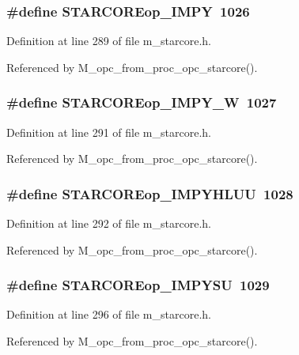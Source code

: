 \subsubsection{\setlength{\rightskip}{0pt plus 5cm}\#define STARCOREop\_\-IMPY~1026}\label{m__starcore_8h_0eb61b22086e094ae2efd020338496ee}




Definition at line 289 of file m\_\-starcore.h.

Referenced by M\_\-opc\_\-from\_\-proc\_\-opc\_\-starcore().
\subsubsection{\setlength{\rightskip}{0pt plus 5cm}\#define STARCOREop\_\-IMPY\_\-W~1027}\label{m__starcore_8h_65524b4827f894e3aa57cd6414d5ff01}




Definition at line 291 of file m\_\-starcore.h.

Referenced by M\_\-opc\_\-from\_\-proc\_\-opc\_\-starcore().
\subsubsection{\setlength{\rightskip}{0pt plus 5cm}\#define STARCOREop\_\-IMPYHLUU~1028}\label{m__starcore_8h_083d2bb4639d4f243063088de57e8aee}




Definition at line 292 of file m\_\-starcore.h.

Referenced by M\_\-opc\_\-from\_\-proc\_\-opc\_\-starcore().
\subsubsection{\setlength{\rightskip}{0pt plus 5cm}\#define STARCOREop\_\-IMPYSU~1029}\label{m__starcore_8h_9c2ddff24703dfc64d67c1d84b6dfdf9}




Definition at line 296 of file m\_\-starcore.h.

Referenced by M\_\-opc\_\-from\_\-proc\_\-opc\_\-starcore().
